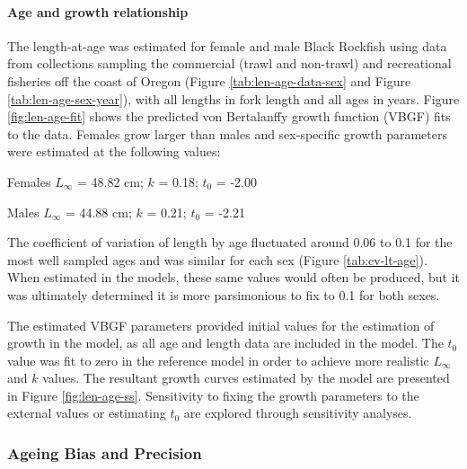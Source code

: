 \documentclass[11pt,
  english,
  letterpaper,
]{article}
\begin{document}
\hypertarget{age-and-growth-relationship}{%
\paragraph{Age and growth relationship}\label{age-and-growth-relationship}}

The length-at-age was estimated for female and male Black Rockfish using data from collections sampling the commercial (trawl and non-trawl) and recreational fisheries off the coast of Oregon (Figure \ref{tab:len-age-data-sex} and Figure \ref{tab:len-age-sex-year}), with all lengths in fork length and all ages in years. Figure \ref{fig:len-age-fit} shows the predicted von Bertalanffy growth function (VBGF) fits to the data. Females grow larger than males and sex-specific growth parameters were estimated at the following values:

\begin{centering}

Females $L_{\infty}$ = 48.82 cm; $k$ = 0.18; $t_0$ = -2.00

Males $L_{\infty}$ = 44.88 cm; $k$ = 0.21; $t_0$ = -2.21

\end{centering}

\vspace{0.5cm}

The coefficient of variation of length by age fluctuated around 0.06 to 0.1 for the most well sampled ages and was similar for each sex (Figure \ref{tab:cv-lt-age}). When estimated in the models, these same values would often be produced, but it was ultimately determined it is more parsimonious to fix to 0.1 for both sexes.

The estimated VBGF parameters provided initial values for the estimation of growth in the model, as all age and length data are included in the model. The \(t_0\) value was fit to zero in the reference model in order to achieve more realistic \(L_{\infty}\) and \(k\) values. The resultant growth curves estimated by the model are presented in Figure \ref{fig:len-age-ss}. Sensitivity to fixing the growth parameters to the external values or estimating \(t_0\) are explored through sensitivity analyses.

\hypertarget{ageing-bias-and-precision}{%
\subsubsection{Ageing Bias and Precision}\label{ageing-bias-and-precision}}
\end{document}

